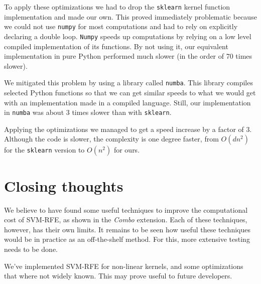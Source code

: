 To apply these optimizations we had to drop the \texttt{sklearn} kernel function im\-ple\-men\-ta\-tion and made our own. This proved immediately problematic because we could not use \texttt{numpy} for most computations and had to rely on explicitly declaring a double loop. \texttt{Numpy} speeds up computations by relying on a low level compiled implementation of its functions. By not using it, our equivalent implementation in pure Python performed much slower (in the order of 70 times slower).

We mitigated this problem by using a library called \texttt{numba}. This library compiles selected Python functions so that we can get similar speeds to what we would get with an implementation made in a compiled language. Still, our implementation in \texttt{numba} was about 3 times slower than with \texttt{sklearn}.

Applying the optimizations we managed to get a speed increase by a factor of 3. Although the code is slower, the complexity is one degree faster, from $O(dn^2)$ for the \texttt{sklearn} version to $O(n^2)$ for ours.

\section{Closing thoughts}

We believe to have found some useful techniques to improve the computational cost of SVM-RFE, as shown in the \emph{Combo} extension. Each of these techniques, however, has their own limits. It remains to be seen how useful these techniques would be in practice as an off-the-shelf method. For this, more extensive testing needs to be done.

We've implemented SVM-RFE for non-linear kernels, and some optimizations that where not widely known. This may prove useful to future developers.
